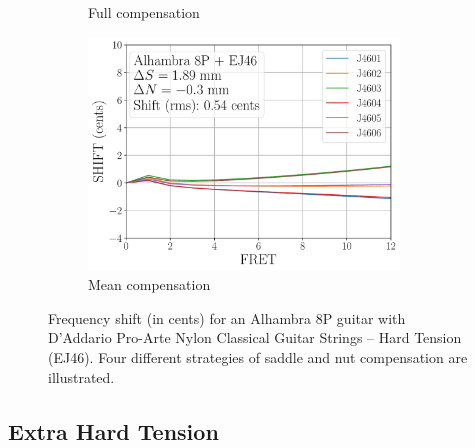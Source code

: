 \begin{figure}
\begin{subfigure}[b]{0.45\textwidth}
   \caption{Full compensation}
   \label{fig:shift_alhambra8p_ej46_full}
  \end{subfigure}
  \hspace{0.25in}
  \begin{subfigure}[b]{0.45\textwidth}
   \centering
   \includegraphics[width=3.25in]{../figures/shift_alhambra8p_ej46_mean}
   \caption{Mean compensation}
   \label{fig:shift_alhambra8p_ej46_mean}
  \end{subfigure}
  \caption{\label{fig:compensation_alhambra8p_ej46} Frequency shift (in cents) for an Alhambra 8P guitar with D'Addario Pro-Arte Nylon Classical Guitar Strings -- Hard Tension (EJ46). Four different strategies of saddle and nut compensation are illustrated.}
 \end{figure}

 \newpage
 \subsection{Extra Hard Tension}


